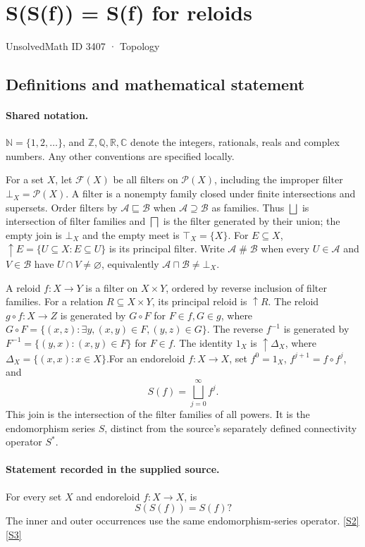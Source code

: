 \documentclass[11pt]{article}
\newcommand{\sref}[2]{\hyperlink{source:#1:#2}{[S#2]}}
\begin{document}
\setcounter{section}{3406}
\section{S(S(f)) = S(f) for reloids}\label{3407}
{\small\sffamily UnsolvedMath ID 3407 · Topology}
\subsection{Definitions and mathematical statement}

\paragraph{Shared notation.}$\mathbb N=\{1,2,\ldots\}$, and $\mathbb Z,\mathbb Q,\mathbb R,\mathbb C$ denote the integers, rationals, reals and complex numbers. Any other conventions are specified locally.


For a set $X$, let $\mathcal F(X)$ be all filters on $\mathcal P(X)$, including the improper filter $\bot_X=\mathcal P(X)$. A filter is a nonempty family closed under finite intersections and supersets. Order filters by $\mathcal A\sqsubseteq\mathcal B$ when $\mathcal A\supseteq\mathcal B$ as families. Thus $\bigsqcup$ is intersection of filter families and $\bigsqcap$ is the filter generated by their union; the empty join is $\bot_X$ and the empty meet is $\top_X=\{X\}$. For $E\subseteq X$, $\uparrow E=\{U\subseteq X:E\subseteq U\}$ is its principal filter. Write $\mathcal A\mathrel{\#}\mathcal B$ when every $U\in\mathcal A$ and $V\in\mathcal B$ have $U\cap V\ne\varnothing$, equivalently $\mathcal A\sqcap\mathcal B\ne\bot_X$.

A reloid $f:X\to Y$ is a filter on $X\times Y$, ordered by reverse inclusion of filter families. For a relation $R\subseteq X\times Y$, its principal reloid is $\uparrow R$. The reloid $g\circ f:X\to Z$ is generated by $G\circ F$ for $F\in f,G\in g$, where $G\circ F=\{(x,z):\exists y,(x,y)\in F,(y,z)\in G\}$. The reverse $f^{-1}$ is generated by $F^{-1}=\{(y,x):(x,y)\in F\}$ for $F\in f$. The identity $1_X$ is $\uparrow\Delta_X$, where $\Delta_X=\{(x,x):x\in X\}$.For an endoreloid $f:X\to X$, set $f^0=1_X$, $f^{j+1}=f\circ f^j$, and
\[
 S(f)=\bigsqcup_{j=0}^{\infty}f^j.
\]
This join is the intersection of the filter families of all powers. It is the endomorphism series $S$, distinct from the source’s separately defined connectivity operator $S^*$.
\paragraph{Statement recorded in the supplied source.}
For every set $X$ and endoreloid $f:X\to X$, is
\[
 S(S(f))=S(f)?
\]
The inner and outer occurrences use the same endomorphism-series operator. \sref{3407}{2}\sref{3407}{3}
\end{document}
